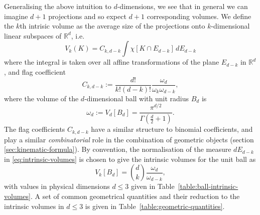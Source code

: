 Generalising the above intuition to $d$-dimensions, we see that in general we can imagine $d+1$ projections and so expect $d+1$ corresponding volumes.
We define the $k$th intrisic volume as the average size of the projections onto $k$-dimensional linear subspaces of $\mathbb{R}^d$, i.e.\ \cite{Klain1997,Santalo2004}
\begin{equation}\label{eq:intrinsic-volumes}
  V_k(K)
  =
  C_{k,d-k}
  \int \chi[K \cap E_{d-k}] \, dE_{d-k}
\end{equation}
where the integral is taken over all affine transformations of the plane $E_{d-k}$ in $\mathbb{R}^d$, and flag coefficient
\begin{equation}\label{eq:flag-coefficients}
  C_{k,d-k}
  :=
  \frac{d!}{k! (d-k)!} \frac{\omega_d}{\omega_k \omega_{d-k}},
\end{equation}
where the volume of the $d$-dimensional ball with unit radius $B_d$ is
\begin{equation}
  \omega_d := V_d[B_d] = \frac{\pi^{d/2}}{\Gamma(\frac{d}{2} + 1)}.
\end{equation}
The flag coefficients $C_{k,d-k}$ have a similar structure to binomial coefficients, and play a similar \emph{combinatorial} role in the combination of geometric objects (section \ref{sec:kinematic-formula}).
By convention, the normalisation of the measure $dE_{d-k}$ in \eqref{eq:intrinsic-volumes} is chosen to give the intrinsic volumes for the unit ball as
\begin{equation}\label{eq:intrinsic-volume-ball}
  V_k [B_d]
  =
  {d \choose k} \frac{\omega_d}{\omega_{d-k}},
\end{equation}
with values in physical dimensions $d \le 3$ given in Table~\ref{table:ball-intrinsic-volumes}.
A set of common geometrical quantities and their reduction to the intrinsic volumes in $d \le 3$ is given in Table~\ref{table:geometric-quantities}.

